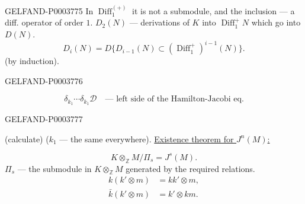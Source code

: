 \begin{GelfandAdjacentEvidence}{GELFAND-P000377}{5}
In $\operatorname{Diff}_1^{(+)}$ it is not a submodule, and the inclusion --- a diff. operator of order $1$.
$D_2(N)$ --- derivations of $K$ into $\operatorname{Diff}_1^+N$ which go into $D (N)$.
\begin{equation*}D_i (N)=D\{D_{i-1}(N)\subset (\operatorname{Diff}_1^+)^{i-1}(N)\}.\end{equation*}
(by induction).



\end{GelfandAdjacentEvidence}
\begin{GelfandAdjacentEvidence}{GELFAND-P000377}{6}

\begin{equation*}\delta_{k_1}\cdots\delta_{k_1}\mathcal D\quad\text{--- left side of the Hamilton-Jacobi eq.}\end{equation*}
\end{GelfandAdjacentEvidence}
\begin{GelfandAdjacentEvidence}{GELFAND-P000377}{7}

(calculate) ($k_1$ --- the same everywhere).
\underline{Existence theorem for $J^n (M)$:}
\end{GelfandAdjacentEvidence}

\begin{equation*}K\otimes_{\mathbb Z}M/\Pi_s=J^s (M).\end{equation*}
$\Pi_s$ --- the submodule in $K\otimes_{\mathbb Z}M$ generated by the required relations.
\begin{align*}k (k'\otimes m)&=kk'\otimes m,\\
\bar k (k'\otimes m)&=k'\otimes km.
\end{align*}



